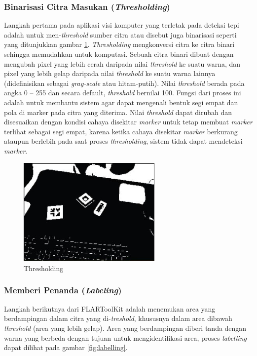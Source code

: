 \subsubsection {Binarisasi Citra Masukan (\textit{Thresholding})}
\label{subsubsec:thresholding}
Langkah pertama pada aplikasi visi komputer yang terletak pada deteksi tepi adalah untuk men-\textit{threshold} sumber citra atau disebut juga binarisasi seperti yang ditunjukkan gambar \ref{fig:thresholding}. \textit{Thresholding} mengkonversi citra ke citra binari sehingga memudahkan untuk komputasi. Sebuah citra binari dibuat dengan mengubah pixel yang lebih cerah daripada nilai \textit{threshold} ke suatu warna, dan pixel yang lebih gelap daripada nilai \textit{threshold} ke suatu warna lainnya (didefinisikan sebagai \textit{gray-scale} atau hitam-putih). Nilai \textit{threshold} berada pada angka 0 – 255 dan secara default, \textit{threshold} bernilai 100. Fungsi dari proses ini adalah untuk membantu sistem agar dapat mengenali bentuk segi empat dan pola di marker pada citra yang diterima. Nilai \textit{threshold} dapat dirubah dan disesuaikan dengan kondisi cahaya disekitar \textit{marker} untuk tetap membuat \textit{marker} terlihat sebagai segi empat, karena ketika cahaya disekitar \textit{marker} berkurang ataupun berlebih pada saat proses \textit{thresholding}, sistem tidak dapat mendeteksi \textit{marker}.
\begin{figure}
\begin{center}
\includegraphics[width=7cm]{./images/flartk/binarize.JPG}
\caption{\label{fig:thresholding} Thresholding}
\end{center}
\end{figure}

\subsubsection {Memberi Penanda (\textit{Labeling})}
\label{subsubsec:labeling}
Langkah berikutnya dari FLARToolKit adalah menemukan area yang berdampingan dalam citra yang di-\textit{treshold}, khususnya dalam area dibawah \textit{threshold} (area yang lebih gelap). Area yang berdampingan diberi tanda dengan warna yang berbeda dengan tujuan untuk mengidentifikasi area, proses \textit{labelling} dapat dilihat pada gambar \ref{fig:labelling}.

